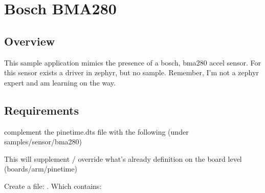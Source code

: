 \documentclass[letterpaper,10pt,english]{sphinxmanual}
\begin{document}
\section{Bosch BMA280}
\label{\detokenize{behind/bma280:bosch-bma280}}
\begin{sphinxVerbatim}[commandchars=\\\{\}]
\end{sphinxVerbatim}


\subsection{Overview}
\label{\detokenize{behind/bma280:overview}}
This sample application mimics the presence of a bosch, bma280 accel sensor.
For this sensor exists a driver in zephyr, but no sample.
Remember, I’m not a zephyr expert and am learning on the way.


\subsection{Requirements}
\label{\detokenize{behind/bma280:requirements}}
complement the pinetime.dts file with the following (under samples/sensor/bma280)

This will supplement / override what’s already definition on the board level (boards/arm/pinetime)

\begin{sphinxVerbatim}[commandchars=\\\{\}]
\end{sphinxVerbatim}

Create a file: .
Which contains:

\begin{sphinxVerbatim}[commandchars=\\\{\}]
 
 
        
        
\end{sphinxVerbatim}
\end{document}
